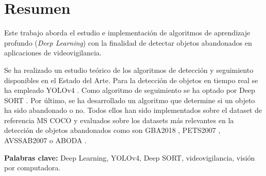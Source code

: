 
\chapter*{Resumen}
\label{cha:resumen}


Este trabajo aborda el estudio e implementación de algoritmos de aprendizaje profundo (\textit{Deep Learning}) con la finalidad de detectar objetos abandonados en aplicaciones de videovigilancia.

Se ha realizado un estudio teórico de los algoritmos de detección y seguimiento disponibles en el Estado del Arte. Para la detección de objetos en tiempo real se ha empleado YOLOv4 \cite{bochkovskiy2020yolov4}. Como algoritmo de seguimiento se ha optado por Deep SORT \cite{Wojke2017simple}. Por último, se ha desarrollado un algoritmo que determine si un objeto ha sido abandonado o no. Todos ellos han sido implementados sobre el dataset de referencia MS COCO \cite{lin2015microsoft} y evaluados sobre los datasets más relevantes en la detección de objetos abandonados como son GBA2018 \cite{gba-dataset}, PETS2007 \cite{pets2007-dataset}, AVSSAB2007 \cite{AVSSAB2007-dataset} o ABODA \cite{aboda-dataset}.

\textbf{Palabras clave:} Deep Learning, YOLOv4, Deep SORT, videovigilancia, visión por computadora.